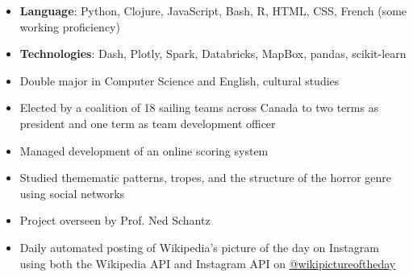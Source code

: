 \begin{itemize}
\item \textbf{Language}: Python, Clojure, JavaScript, Bash, R, HTML, CSS, French (some working proficiency)
\item \textbf{Technologies}: Dash, Plotly, Spark, Databricks, MapBox, pandas, scikit-learn
\end{itemize}

\begin{itemize}
\item Double major in Computer Science and English, cultural studies
\end{itemize}

\begin{itemize}
\item Elected by a coalition of 18 sailing teams across Canada to two terms as president and one term as team development officer \item Managed development of an online scoring system
\end{itemize}

\begin{itemize}
\item  Studied themematic patterns, tropes, and the structure of the horror genre using social networks
\item Project overseen by Prof. Ned Schantz
\end{itemize}
\begin{itemize}
\item Daily automated posting of Wikipedia's picture of the day on Instagram using both the Wikipedia API and Instagram API on \href{http://instagram.com/wikipictureoftheday}{@wikipictureoftheday}
\end{itemize}


